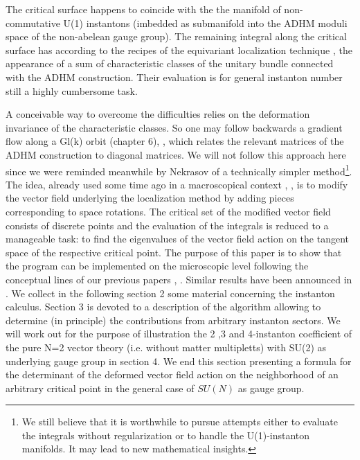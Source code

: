 \documentclass[a4paper,12pt]{article}
\begin{document}
The critical surface happens to coincide with the the manifold of
non-commutative U(1) instantons (imbedded as submanifold into the
ADHM moduli space of the non-abelean gauge group). The remaining
integral along the critical surface has according to the recipes
of the equivariant localization technique \cite{B}, \cite{BGV} the
appearance of a sum of characteristic classes of the unitary
bundle connected with the ADHM construction. Their evaluation is
for general instanton number still a highly cumbersome task.

A conceivable way to overcome the difficulties relies on the
deformation invariance of the characteristic classes. So one may
follow backwards a gradient flow along a Gl(k) orbit \cite{DK}
(chapter 6), \cite{Nak}, which relates the relevant matrices of
the ADHM construction to diagonal matrices. We will not follow
this approach here since we were reminded meanwhile by Nekrasov
\cite{N} of a technically simpler method\footnote{We still believe
that it is worthwhile to pursue attempts either to evaluate the
integrals without regularization or to handle the U(1)-instanton
manifolds. It may lead to new mathematical insights.}. The idea,
already used some time ago in a macroscopical context
\cite{MNSch1}, \cite{MNSch2}, is to modify the vector field
underlying the localization method by adding pieces corresponding
to space rotations. The critical set of the modified vector field
consists of discrete points and the evaluation of the integrals is
reduced to a manageable task: to find the eigenvalues of the
vector field action on the tangent space of the respective
critical point. The purpose of this paper is to show that the
program can be implemented on the microscopic level following the
conceptual lines of our previous papers \cite{FPS1}, \cite{FPS2}.
Similar results have been announced in \cite{N}. We collect in the
following section 2 some material concerning the instanton
calculus. Section 3 is devoted to a description of the algorithm
allowing to determine (in principle) the contributions from
arbitrary instanton sectors. We will work out for the purpose of
illustration the 2 ,3 and 4-instanton coefficient of the pure N=2
vector theory (i.e. without matter multipletts) with SU(2) as
underlying gauge group in section 4. We end this section
presenting a formula for the determinant of the deformed vector
field action on the neighborhood of an arbitrary critical point in
the general case of $SU(N)$ as gauge group.

\setcounter{equation}{0}
\end{document}
